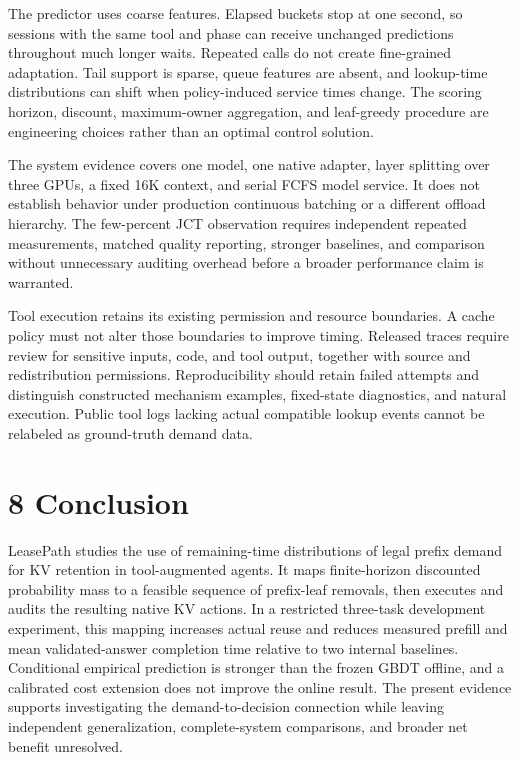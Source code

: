 \documentclass[
  english,
  10pt,
]{article}
\begin{document}
The predictor uses coarse features. Elapsed buckets stop at one second,
so sessions with the same tool and phase can receive unchanged
predictions throughout much longer waits. Repeated calls do not create
fine-grained adaptation. Tail support is sparse, queue features are
absent, and lookup-time distributions can shift when policy-induced
service times change. The scoring horizon, discount, maximum-owner
aggregation, and leaf-greedy procedure are engineering choices rather
than an optimal control solution.

The system evidence covers one model, one native adapter, layer
splitting over three GPUs, a fixed 16K context, and serial FCFS model
service. It does not establish behavior under production continuous
batching or a different offload hierarchy. The few-percent JCT
observation requires independent repeated measurements, matched quality
reporting, stronger baselines, and comparison without unnecessary
auditing overhead before a broader performance claim is warranted.

Tool execution retains its existing permission and resource boundaries.
A cache policy must not alter those boundaries to improve timing.
Released traces require review for sensitive inputs, code, and tool
output, together with source and redistribution permissions.
Reproducibility should retain failed attempts and distinguish
constructed mechanism examples, fixed-state diagnostics, and natural
execution. Public tool logs lacking actual compatible lookup events
cannot be relabeled as ground-truth demand data.

\section{8 Conclusion}\label{conclusion}

LeasePath studies the use of remaining-time distributions of legal
prefix demand for KV retention in tool-augmented agents. It maps
finite-horizon discounted probability mass to a feasible sequence of
prefix-leaf removals, then executes and audits the resulting native KV
actions. In a restricted three-task development experiment, this mapping
increases actual reuse and reduces measured prefill and mean
validated-answer completion time relative to two internal baselines.
Conditional empirical prediction is stronger than the frozen GBDT
offline, and a calibrated cost extension does not improve the online
result. The present evidence supports investigating the
demand-to-decision connection while leaving independent generalization,
complete-system comparisons, and broader net benefit unresolved.
\end{document}
